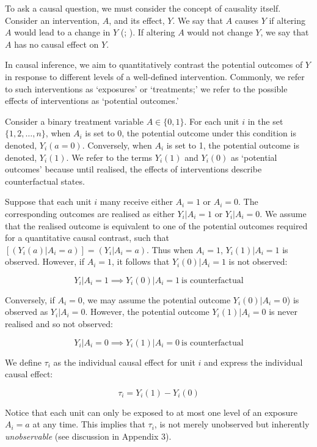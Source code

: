 \documentclass[
  singlecolumn]{article}
\begin{document}
To ask a causal question, we must consider the concept of causality
itself. Consider an intervention, \(A\), and its effect, \(Y\). We say
that \(A\) causes \(Y\) if altering \(A\) would lead to a change in
\(Y\) (;
). If altering \(A\) would not
change \(Y\), we say that \(A\) has no causal effect on \(Y\).

In causal inference, we aim to quantitatively contrast the potential
outcomes of \(Y\) in response to different levels of a well-defined
intervention. Commonly, we refer to such interventions as `exposures' or
`treatments;' we refer to the possible effects of interventions as
`potential outcomes.'

Consider a binary treatment variable \(A \in \{0,1\}\). For each unit
\(i\) in the set \(\{1, 2, \ldots, n\}\), when \(A_i\) is set to 0, the
potential outcome under this condition is denoted, \(Y_i(a=0)\).
Conversely, when \(A_i\) is set to 1, the potential outcome is denoted,
\(Y_i(1)\). We refer to the terms \(Y_i(1)\) and \(Y_i(0)\) as
`potential outcomes' because until realised, the effects of
interventions describe counterfactual states.

Suppose that each unit \(i\) many receive either \(A_i = 1\) or
\(A_i = 0\). The corresponding outcomes are realised as either
\(Y_i|A_i = 1\) or \(Y_i|A_i = 0\). We assume that the realised outcome
is equivalent to one of the potential outcomes required for a
quantitative causal contrast, such that
\([(Y_i(a)|A_i = a)] = (Y_i|A_i = a)\). Thus when \(A_i = 1\),
\(Y_i(1)|A_i = 1\) is observed. However, if \(A_i = 1\), it follows that
\(Y_i(0)|A_i = 1\) is not observed:

\[
Y_i|A_i = 1 \implies Y_i(0)|A_i = 1~ \text{is counterfactual}
\]

Conversely, if \(A_i = 0\), we may assume the potential outcome
\(Y_i(0)|A_i = 0\)) is observed as \(Y_i|A_i = 0\). However, the
potential outcome \(Y_i(1)|A_i = 0\) is never realised and so not
observed:

\[
Y_i|A_i = 0 \implies Y_i(1)|A_i = 0~ \text{is counterfactual}
\]

We define \(\tau_i\) as the individual causal effect for unit \(i\) and
express the individual causal effect:

\[
\tau_i = Y_i(1) - Y_i(0)
\]

Notice that each unit can only be exposed to at most one level of an
exposure \(A_i = a\) at any time. This implies that \(\tau_i\), is not
merely unobserved but inherently \emph{unobservable} (see discussion in
Appendix 3).
\end{document}
